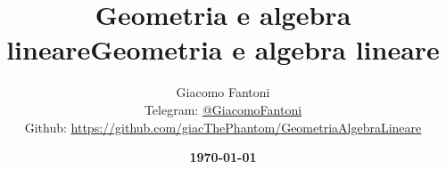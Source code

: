 

\title{\Huge \textbf{Geometria e algebra lineare}}

\author{
  Giacomo Fantoni \\
  \small Telegram: \href{https://t.me/GiacomoFantoni}{@GiacomoFantoni} \\[3pt]
  \small Github: \href{https://github.com/giacThePhantom/GeometriaAlgebraLineare}{https://github.com/giacThePhantom/GeometriaAlgebraLineare}}
\title{\LARGE \textbf{Geometria e algebra lineare}}
 \date{\textbf{\today}} %


\maketitle    
{}
\tableofcontents













